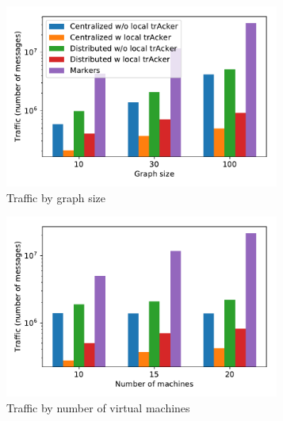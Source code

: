 \begin{figure}[t!]
    \begin{subfigure}[b]{0.32\textwidth}
            \includegraphics[width=0.99\textwidth]{pics/traffic_by_graph_size_bars.pdf}
            \caption{Traffic by graph size}
            \label{traffic_graph}
    \end{subfigure}
    \hspace{5mm}
    \begin{subfigure}[b]{0.32\textwidth}
            \includegraphics[width=0.99\textwidth]{pics/traffic_by_number_of_machines_bars.pdf}
            \caption{Traffic by number of virtual machines}
            \label{traffic_machines}
    \end{subfigure}
    \hspace{5mm}
    \begin{subfigure}[b]{0.32\textwidth}

\end{subfigure}
\end{figure}
